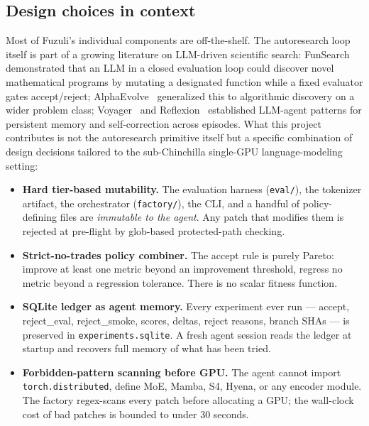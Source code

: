 \documentclass[11pt,a4paper]{article}
\begin{document}
\subsection{Design choices in context}\label{sec:design}

Most of Fuzuli's individual components are off-the-shelf. The autoresearch
loop itself is part of a growing literature on LLM-driven scientific search:
FunSearch~\citep{romeraparedes2024funsearch} demonstrated that an LLM in a
closed evaluation loop could discover novel mathematical programs by
mutating a designated function while a fixed evaluator gates accept/reject;
AlphaEvolve~\citep{novikov2025alphaevolve} generalized this to algorithmic
discovery on a wider problem class; Voyager~\citep{wang2023voyager} and
Reflexion~\citep{shinn2023reflexion} established LLM-agent patterns for
persistent memory and self-correction across episodes. What this project
contributes is not the autoresearch primitive itself but a specific
combination of design decisions tailored to the sub-Chinchilla single-GPU
language-modeling setting:
\begin{itemize}[leftmargin=*,nosep]
  \item \textbf{Hard tier-based mutability.} The evaluation harness
    (\texttt{eval/}), the tokenizer artifact, the orchestrator
    (\texttt{factory/}), the CLI, and a handful of policy-defining files are
    \emph{immutable to the agent}. Any patch that modifies them is rejected
    at pre-flight by glob-based protected-path checking.
  \item \textbf{Strict-no-trades policy combiner.} The accept rule is
    purely Pareto: improve at least one metric beyond an improvement
    threshold, regress no metric beyond a regression tolerance. There is no
    scalar fitness function.
  \item \textbf{SQLite ledger as agent memory.} Every experiment ever run
    --- accept, reject\_eval, reject\_smoke, scores, deltas, reject reasons,
    branch SHAs --- is preserved in \texttt{experiments.sqlite}. A fresh
    agent session reads the ledger at startup and recovers full memory of
    what has been tried.
  \item \textbf{Forbidden-pattern scanning before GPU.} The agent cannot
    import \texttt{torch.distributed}, define MoE, Mamba, S4, Hyena, or any
    encoder module. The factory regex-scans every patch before allocating a
    GPU; the wall-clock cost of bad patches is bounded to under 30 seconds.
\end{itemize}
\end{document}
